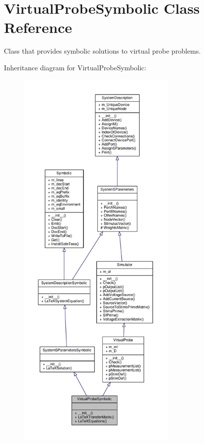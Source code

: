 \hypertarget{classSignalIntegrity_1_1SystemDescriptions_1_1VirtualProbeSymbolic_1_1VirtualProbeSymbolic}{}\section{Virtual\+Probe\+Symbolic Class Reference}
\label{classSignalIntegrity_1_1SystemDescriptions_1_1VirtualProbeSymbolic_1_1VirtualProbeSymbolic}


Class that provides symbolic solutions to virtual probe problems.  




Inheritance diagram for Virtual\+Probe\+Symbolic\+:
\nopagebreak
\begin{figure}[H]
\begin{center}
\leavevmode
\includegraphics[height=550pt]{classSignalIntegrity_1_1SystemDescriptions_1_1VirtualProbeSymbolic_1_1VirtualProbeSymbolic__inherit__graph}
\end{center}
\end{figure}


